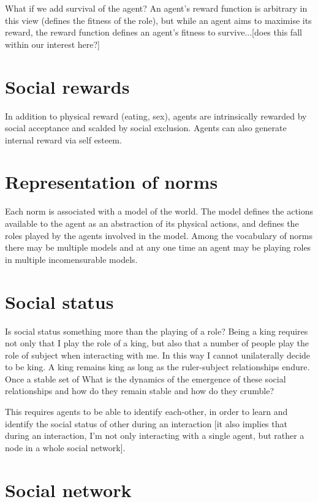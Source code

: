 \documentclass[a4paper]{article}
\begin{document}
What if we add survival of the agent?
An agent's reward function is arbitrary in this view (defines the fitness of the role), but while an agent aims to maximise its reward, the reward function defines an agent's fitness to survive...[does this fall within our interest here?]

\section{Social rewards}

In addition to physical reward (eating, sex), agents are intrinsically rewarded by social acceptance and scalded by social exclusion. Agents can also generate internal reward via self esteem.

\section{Representation of norms}

Each norm is associated with a model of the world. The model defines the actions available to the agent as an abstraction of its physical actions, and defines the roles played by the agents involved in the model. Among the vocabulary of norms there may be multiple models and at any one time an agent may be playing roles in multiple incomensurable models. 


\section{Social status}

Is social status something more than the playing of a role? Being a king requires not only that I play the role of a king, but also that a number of people play the role of subject when interacting with me. In this way I cannot unilaterally decide to be king. A king remains king as long as the ruler-subject relationships endure. Once a stable set of   What is the dynamics of the emergence of these social relationships and how do they remain stable and how do they crumble? 

This requires agents to be able to identify each-other, in order to learn and identify the social status of other during an interaction [it also implies that during an interaction, I'm not only interacting with a single agent, but rather a node in a whole social network].

\section{Social network}
\end{document}

